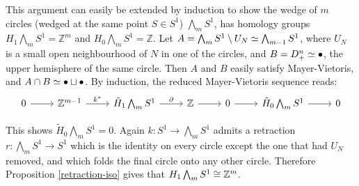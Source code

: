 \begin{example}
This argument can easily be extended by induction to show the wedge of $m$ circles (wedged at the same point $S\in S^1$) $\bigwedge_m S^1$, has homology groups $H_1\bigwedge_m S^1=\mathbb{Z}^m$ and $H_0\bigwedge_m S^1=\mathbb{Z}$. Let $A=\bigwedge_{m} S^1\setminus U_N\simeq \bigwedge_{m-1} S^1$, where $U_{N}$ is a small open neighbourhood of $N$ in one of the circles, and $B=D^n_+\simeq \bullet$, the upper hemisphere of the same circle. Then $A$ and $B$ easily satisfy Mayer-Vietoris, and $A\cap B\simeq \bullet \sqcup \bullet$. By induction, the reduced Mayer-Vietoris sequence reads:
\[\begin{tikzcd}
0 \arrow[r] & \mathbb{Z}^{m-1} \arrow[r, "k^*"] & \tilde{H}_1\bigwedge_{m} S^1 \arrow[r, "\partial"] & \mathbb{Z} \arrow[r] & 0 \arrow[r] & \tilde{H}_0\bigwedge_{m} S^1 \arrow[r] & 0
\end{tikzcd}\]

This shows $\tilde{H}_0 \bigwedge_m S^1=0$. Again  $k:S^1\rightarrow \bigwedge_m S^1$ admits a retraction $r:\bigwedge_m S^1\rightarrow S^1$ which is the identity on every circle except the one that had $U_N$ removed, and which folds the final circle onto any other circle. Therefore Proposition \ref{retraction-iso} gives that $H_1 \bigwedge_m S^1\cong \mathbb{Z}^{m}$.
\end{example}

